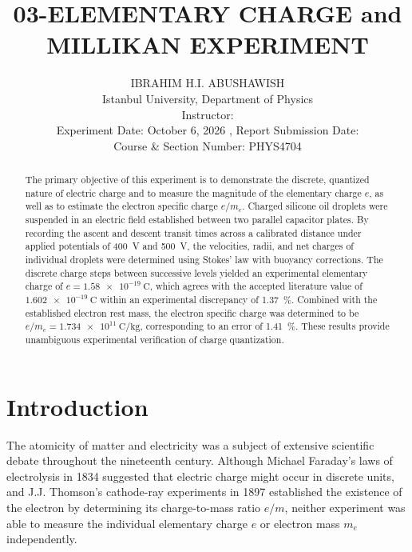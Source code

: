 \documentclass[journal]{IEEEtran}
\begin{document}
\title{03-ELEMENTARY CHARGE and MILLIKAN EXPERIMENT}
\author{IBRAHIM H.I. ABUSHAWISH \\
Istanbul University, Department of Physics \\
Instructor: \\
Experiment Date: October 6, 2026 , Report Submission Date: \\
Course \& Section Number: PHYS4704}


\maketitle

\begin{abstract}
The primary objective of this experiment is to demonstrate the discrete, quantized nature of electric charge and to measure the magnitude of the elementary charge $e$, as well as to estimate the electron specific charge $e/m_e$. Charged silicone oil droplets were suspended in an electric field established between two parallel capacitor plates. By recording the ascent and descent transit times across a calibrated distance under applied potentials of \SI{400}{\volt} and \SI{500}{\volt}, the velocities, radii, and net charges of individual droplets were determined using Stokes' law with buoyancy corrections. The discrete charge steps between successive levels yielded an experimental elementary charge of $e = \SI{1.58e-19}{\coulomb}$, which agrees with the accepted literature value of $\SI{1.602e-19}{\coulomb}$ within an experimental discrepancy of \SI{1.37}{\percent}. Combined with the established electron rest mass, the electron specific charge was determined to be $e/m_e = \SI{1.734e11}{\coulomb\per\kilogram}$, corresponding to an error of \SI{1.41}{\percent}. These results provide unambiguous experimental verification of charge quantization.
\end{abstract}

\section{Introduction}
The atomicity of matter and electricity was a subject of extensive scientific debate throughout the nineteenth century. Although Michael Faraday's laws of electrolysis in 1834 suggested that electric charge might occur in discrete units, and J.J. Thomson's cathode-ray experiments in 1897 established the existence of the electron by determining its charge-to-mass ratio $e/m$, neither experiment was able to measure the individual elementary charge $e$ or electron mass $m_e$ independently.
\end{document}
